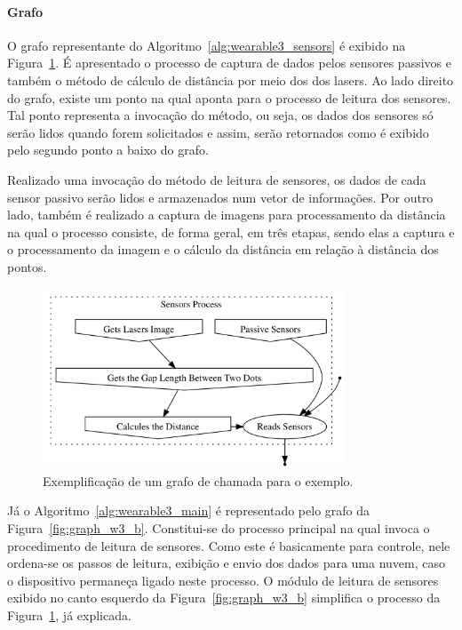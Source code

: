       \paragraph{Grafo}
         O grafo representante do Algoritmo~\ref{alg:wearable3_sensors} é exibido na Figura~\ref{fig:graph_w3_a}.
         É apresentado o processo de captura de dados pelos sensores passivos e também o método de cálculo de distância por meio dos dos lasers.
         Ao lado direito do grafo, existe um ponto na qual aponta para o processo de leitura dos sensores.
         Tal ponto representa a invocação do método, ou seja, os dados dos sensores só serão lidos quando forem solicitados e assim, serão retornados como é exibido pelo segundo ponto a baixo do grafo.
         
         Realizado uma invocação do método de leitura de sensores, os dados de cada sensor passivo serão lidos e armazenados num vetor de informações.
         Por outro lado, também é realizado a captura de imagens para processamento da distância na qual o processo consiste, de forma geral, em três etapas, sendo elas a captura e o processamento da imagem e o cálculo da distância em relação à distância dos pontos.
        
         \begin{figure}[h] \centering
            \includegraphics[width=0.8\textwidth]{img/graph_wearable3_b.png}
            \caption{Exemplificação de um grafo de chamada para o exemplo.}
            \label{fig:graph_w3_a}
         \end{figure}
         
         Já o Algoritmo~\ref{alg:wearable3_main} é representado pelo grafo da Figura~\ref{fig:graph_w3_b}.
         Constitui-se do processo principal na qual invoca o procedimento de leitura de sensores.
         Como este é basicamente para controle, nele ordena-se os passos de leitura, exibição e envio dos dados para uma nuvem, caso o dispositivo permaneça ligado neste processo.
         O módulo de leitura de sensores exibido no canto esquerdo da Figura~\ref{fig:graph_w3_b} simplifica o processo da Figura~\ref{fig:graph_w3_a}, já explicada.
         
